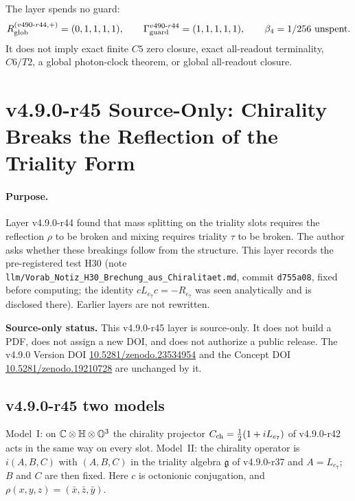 The layer spends no guard:
\[
R_{\rm glob}^{(v490\text{-}r44,+)}=(0,1,1,1,1),
\qquad
\Gamma_{\rm guard}^{v490\text{-}r44}=(1,1,1,1,1),
\qquad
\beta_4=1/256\ \text{unspent}.
\]
It does not imply exact finite \(C5\) zero closure, exact all-readout terminality,
\(C6/T2\), a global photon-clock theorem, or global all-readout closure.
\clearpage
\section*{v4.9.0-r45 Source-Only: Chirality Breaks the Reflection of the Triality Form}
\label{sec:v490-r45-chirality-breaks-reflection}

\paragraph{Purpose.}
Layer v4.9.0-r44 found that mass splitting on the triality slots requires the reflection \(\rho\) to be broken and mixing requires triality
\(\tau\) to be broken.  The author asks whether these breakings follow from the structure.  This layer records the pre-registered test H30
(note \texttt{llm/Vorab\_Notiz\_H30\_Brechung\_aus\_Chiralitaet.md}, commit \texttt{d755a08}, fixed before computing; the identity
\(cL_{e_7}c=-R_{e_7}\) was seen analytically and is disclosed there).  Earlier layers are not rewritten.

\noindent\textbf{Source-only status.}
This v4.9.0-r45 layer is source-only.  It does not build a PDF, does not assign a new DOI,
and does not authorize a public release.  The v4.9.0 Version DOI
\href{https://doi.org/10.5281/zenodo.23534954}{10.5281/zenodo.23534954} and the Concept DOI
\href{https://doi.org/10.5281/zenodo.19210728}{10.5281/zenodo.19210728} are unchanged by it.

\subsection*{v4.9.0-r45 two models}
\label{subsec:v490-r45-models}

Model~I: on \(\mathbb C\otimes\mathbb{H}\otimes\mathbb{O}^3\) the chirality projector \(C_{\rm ch}=\tfrac12(1+iL_{e_7})\) of v4.9.0-r42 acts in the same way on
every slot.  Model~II: the chirality operator is \(i(A,B,C)\) with \((A,B,C)\) in the triality algebra \(\mathfrak g\) of v4.9.0-r37 and
\(A=L_{e_7}\); \(B\) and \(C\) are then fixed.  Here \(c\) is octonionic conjugation, and \(\rho(x,y,z)=(\bar x,\bar z,\bar y)\).

